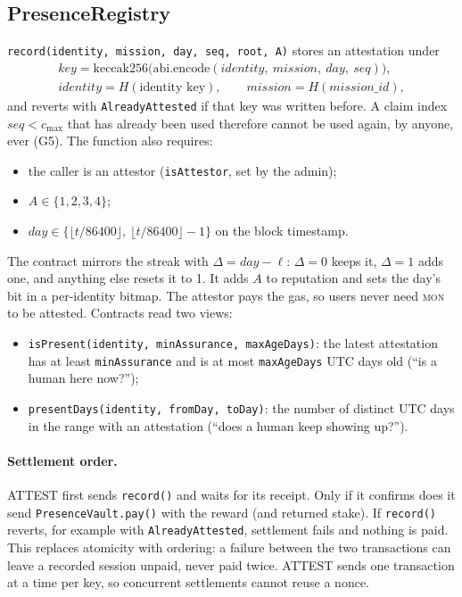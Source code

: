 \documentclass[10pt]{article}
\newcommand{\code}[1]{\texttt{\small #1}}
\newcommand{\mon}{\textsc{mon}}
\begin{document}
\subsection{PresenceRegistry}
\code{record(identity, mission, day, seq, root, A)} stores an attestation under
\begin{gather}\label{eq:pda}
\textit{key}=\mathrm{keccak256}\big(\mathrm{abi.encode}(\textit{identity},\ \textit{mission},\ \textit{day},\ \textit{seq})\big),\\
\textit{identity}=H(\text{identity key}),\qquad \textit{mission}=H(\textit{mission\_id}),\nonumber
\end{gather}
and reverts with \code{AlreadyAttested} if that key was written before. A claim index $\textit{seq}<c_{\max}$ that has
already been used therefore cannot be used again, by anyone, ever (G5). The function also requires:
\begin{itemize}
\item the caller is an attestor (\code{isAttestor}, set by the admin);
\item $A\in\{1,2,3,4\}$;
\item $\textit{day}\in\{\lfloor t/86400\rfloor,\ \lfloor t/86400\rfloor-1\}$ on the block timestamp.
\end{itemize}
The contract mirrors the streak with $\Delta=\textit{day}-\ell$: $\Delta=0$ keeps it, $\Delta=1$ adds one, and anything
else resets it to 1. It adds $A$ to reputation and sets the day's bit in a per-identity bitmap. The attestor pays the
gas, so users never need \mon{} to be attested. Contracts read two views:
\begin{itemize}
\item \code{isPresent(identity, minAssurance, maxAgeDays)}: the latest attestation has at least \code{minAssurance} and is
at most \code{maxAgeDays} UTC days old (``is a human here now?'');
\item \code{presentDays(identity, fromDay, toDay)}: the number of distinct UTC days in the range with an attestation
(``does a human keep showing up?'').
\end{itemize}

\paragraph{Settlement order.} ATTEST first sends \code{record()} and waits for its receipt. Only if it confirms does it
send \code{PresenceVault.pay()} with the reward (and returned stake). If \code{record()} reverts, for example with
\code{AlreadyAttested}, settlement fails and nothing is paid. This replaces atomicity with ordering: a failure between
the two transactions can leave a recorded session unpaid, never paid twice. ATTEST sends one transaction at a time per
key, so concurrent settlements cannot reuse a nonce.
\end{document}
